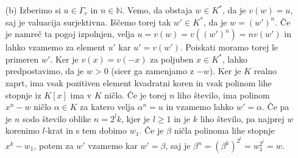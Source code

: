 \documentclass[a4paper, 12pt]{article}
\newcommand{\N}{\mathbb{N}}
\begin{document}
\begin{enumerate}
\item[(b)] Izberimo si $u\in \Gamma_v$ in $n\in \N$. Vemo, da obstaja $w\in K^*$, da je $v(w) = u$, saj je valuacija surjektivna. Iščemo torej tak $w'\in K^*$, da je $w = (w')^n$. Če je namreč ta pogoj izpolnjen, velja $u = v(w)=  v((w')^n) = nv(w')$ in lahko vzamemo za element $u'$ kar $u'=v(w')$. Poiskati moramo torej le primeren $w'$. Ker je $v(x) = v(-x)$ za poljuben $x\in K^*$, lahko predpostavimo, da je $w > 0$ (sicer ga zamenjamo z $-w$). Ker je $K$ realno zaprt, ima vsak pozitiven element kvadratni koren in vsak polinom lihe stopnje iz $K[x]$ ima v $K$ ničlo. Če je torej $n$ liho število, ima polinom $x^n - w$ ničlo $\alpha \in K$ za katero velja $\alpha^n = u$ in vzamemo lahko $w' = \alpha$. Če pa je $n$ sodo število oblike $n = 2^l k$, kjer je $l\ge 1$ in je $k$ liho število, pa najprej $w$ korenimo $l$-krat in s tem dobimo $w_1$. Če je $ \beta $ ničla polinoma lihe stopnje $x^k - w_1$, potem za $w'$ vzamemo kar $w' = \beta$, saj je $\beta^n = (\beta^k ) ^{2^l}   = w_1^{2^l} = w$. 


\end{enumerate}
\end{document}
